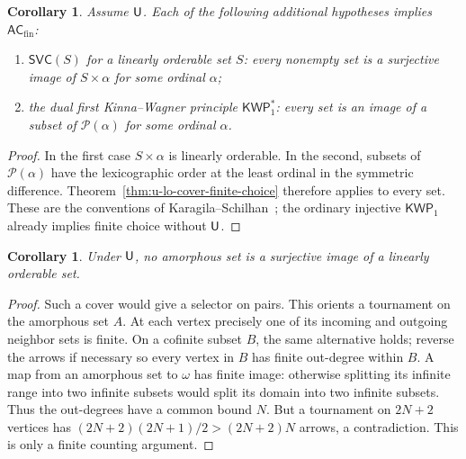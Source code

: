 \documentclass[11pt,a4paper]{article}
\newtheorem{corollary}[theorem]{Corollary}
\theoremstyle{definition}\newtheorem{definition}[theorem]{Definition}
\theoremstyle{remark}\newtheorem{remark}[theorem]{Remark}
\newcommand{\ACfin}{\mathsf{AC}_{\mathrm{fin}}}
\begin{document}
\begin{corollary}\label{cor:u-cover-named}
Assume $\mathsf U$. Each of the following additional hypotheses implies $\ACfin$:
\begin{enumerate}
\item $\mathsf{SVC}(S)$ for a linearly orderable set $S$: every nonempty set is a surjective image of $S\times\alpha$ for some ordinal $\alpha$;
\item the dual first Kinna--Wagner principle $\mathsf{KWP}^{*}_{1}$: every set is an image of a subset of $\mathcal P(\alpha)$ for some ordinal $\alpha$.
\end{enumerate}
\end{corollary}
\begin{proof}
In the first case $S\times\alpha$ is linearly orderable. In the second, subsets of $\mathcal P(\alpha)$ have the lexicographic order at the least ordinal in the symmetric difference. Theorem~\ref{thm:u-lo-cover-finite-choice} therefore applies to every set. These are the conventions of Karagila--Schilhan~\cite[Definitions~2.1 and 3.1]{KS}; the ordinary injective $\mathsf{KWP}_1$ already implies finite choice without $\mathsf U$.
\end{proof}

\begin{corollary}
Under $\mathsf U$, no amorphous set is a surjective image of a linearly orderable set.
\end{corollary}
\begin{proof}
Such a cover would give a selector on pairs. This orients a tournament on the amorphous set $A$. At each vertex precisely one of its incoming and outgoing neighbor sets is finite. On a cofinite subset $B$, the same alternative holds; reverse the arrows if necessary so every vertex in $B$ has finite out-degree within $B$. A map from an amorphous set to $\omega$ has finite image: otherwise splitting its infinite range into two infinite subsets would split its domain into two infinite subsets. Thus the out-degrees have a common bound $N$. But a tournament on $2N+2$ vertices has $(2N+2)(2N+1)/2>(2N+2)N$ arrows, a contradiction. This is only a finite counting argument.
\end{proof}
\end{document}

